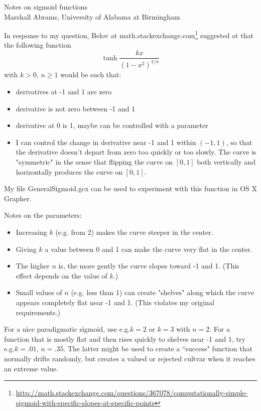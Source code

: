 \documentclass[11pt]{article}
\author{Marshall Abrams, University of Alabama at Birmingham, mabrams@uab.edu}
\makeatletter
\newcommand{\eg}{e.g.\@\xspace}
\newcommand{\fn}[1]{\footnote{#1}}
\makeatother
\begin{document}
\pagestyle{empty}
\myfontscale %

{\Large Notes on sigmoid functions}\\
{\large Marshall Abrams, University of Alabama at Birmingham}

In response to my question, Belov at math.stackexchange.com\fn{
    \tiny \url{http://math.stackexchange.com/questions/367078/computationally-simple-sigmoid-with-specific-slopes-at-specific-points}}
suggested at that the following function 
\[
    \tanh\frac{kx}{(1-x^2)^{1/n}}
\]
with $k>0$, $n\geq 1$ would be such that:
\begin{itemize}
\item derivatives at -1 and 1 are zero
\item derivative is not zero between -1 and 1
\item derivative at 0 is 1, maybe can be controlled with a
    parameter
\item I can control the change in derivative near -1 and 1 within
    $(-1,1)$, so that the derivative doesn't depart from zero too
    quickly or too slowly. The curve is "symmetric" in the sense
    that flipping the curve on $[0,1]$ both vertically and
    horizontally produces the curve on $[0,1]$.
\end{itemize}
My file GeneralSigmoid.gcx can be used to experiment with this
function in OS X Grapher.

Notes on the parameters:
\begin{itemize}
\item Increasing $k$ (e.g. from 2) makes the curve steeper in the
    center.
\item Giving $k$ a value between 0 and 1 can make the curve very
    flat in the center.
\item The higher $n$ is, the more gently the curve slopes toward
    -1 and 1.  (This effect depends on the value of $k$.)
\item Small values of $n$ (\eg less than 1) can create "shelves"
    along which the curve appears completely flat near -1 and 1.
    (This violates my original requirements.)
\end{itemize}
For a nice paradigmatic sigmoid, use \eg $k=2$ or $k=3$ with
$n=2$.  For a function that is mostly flat and then rises quickly
to shelves near -1 and 1, try \eg $k=.01$, $n=.35$.  The latter
might be used to create a ``success" function that normally
drifts randomly, but creates a valued or rejected cultvar when
it reaches an extreme value.
\end{document}
